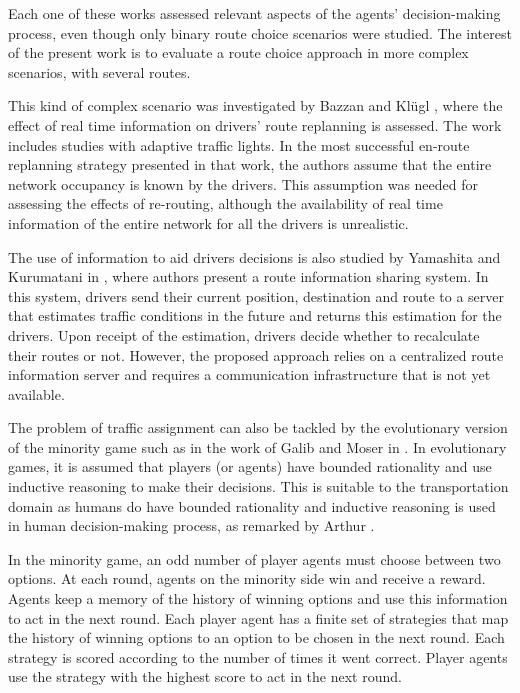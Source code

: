\documentclass{RITA}
\begin{document}
Each one of these works assessed relevant aspects of the agents' decision-making process, even though only binary route choice scenarios were studied. The interest of the present work is to evaluate a route choice approach in more complex scenarios, with several routes.

This kind of complex scenario was investigated by Bazzan and Kl\"ugl \cite{Bazzan&Kluegl2008}, where the effect of real time information on drivers' route replanning is assessed. The work includes studies with adaptive traffic lights. In the most successful en-route replanning strategy presented in that work, the authors assume that the entire network occupancy is known by the drivers. This assumption was needed for assessing the effects of re-routing, although the availability of real time information of the entire network for all the drivers is  unrealistic.

The use of information to aid drivers decisions is also studied by Yamashita and Kurumatani in \cite{Yamashita&Kurumatani2009}, where authors present a route information sharing system. In this system, drivers send their current position, destination and route to a server that estimates traffic conditions in the future and returns this estimation for the drivers. Upon receipt of the estimation, drivers decide whether to recalculate their routes or not. However, the proposed approach relies on a centralized route information server and requires a communication infrastructure that is not yet available.

The problem of traffic assignment can also be tackled by the evolutionary version of the minority game \cite{Challet&Zhang1997} such as in the work of Galib and Moser in \cite{Galib&Moser2011}. In evolutionary games, it is assumed that players (or agents) have bounded rationality and use inductive reasoning to make their decisions. This is suitable to the transportation domain as humans do have bounded rationality and inductive reasoning is used in human decision-making process, as remarked by Arthur \cite{Arthur1994}.

In the minority game, an odd number of player agents must choose between two options. At each round, agents on the minority side win and receive a reward. Agents keep a memory of the history of winning options and use this information to act in the next round. Each player agent has a finite set of strategies that map the history of winning options to an option to be chosen in the next round. Each strategy is scored according to the number of times it went correct. Player agents use the strategy with the highest score to act in the next round.
\end{document}
